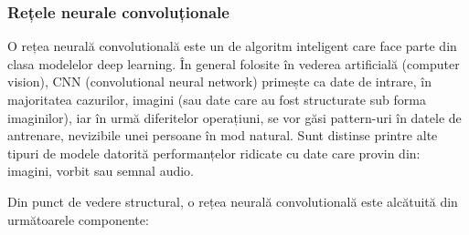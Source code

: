 \documentclass[a4paper, 12pt]{report}
\begin{document}
	\clearpage
	\subsubsection{Rețele neurale convoluționale}
	O rețea neurală convolutională este un de algoritm inteligent care face parte din clasa modelelor deep learning. În general folosite în vederea artificială (computer vision), CNN (convolutional neural network) primește ca date de intrare, în majoritatea cazurilor, imagini (sau date care au fost structurate sub forma imaginilor), iar în urmă diferitelor operațiuni, se vor găsi pattern-uri în datele de antrenare, nevizibile unei persoane în mod natural. Sunt distinse printre alte tipuri de modele datorită performanțelor ridicate cu date care provin din: imagini, vorbit 	sau semnal audio.
	
	Din punct de vedere structural, o rețea neurală convolutională este alcătuită din următoarele componente:
\end{document}
